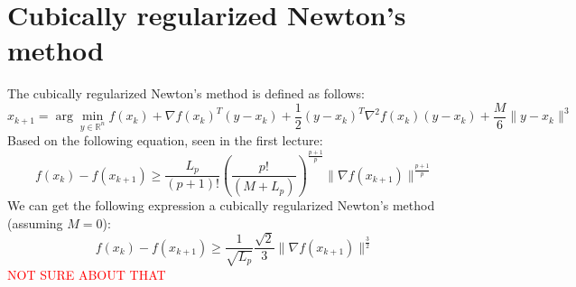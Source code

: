 \documentclass[12pt, openany]{report}
\newcommand{\R}{\mathbb{R}}
\theoremstyle{definition}
\begin{document}
\section{Cubically regularized Newton's method}
The cubically regularized Newton's method is defined as follows:
\begin{equation}\label{eq:cubically_regularized_newton}
	x_{k+1} = \arg \min_{y \in \R^n} f(x_k) + \nabla f(x_k)^T (y-x_k) + \frac{1}{2} (y-x_k)^T \nabla^2 f(x_k) (y-x_k) + \frac{M}{6} \|y-x_k\|^3
\end{equation}
Based on the following equation, seen in the first lecture:
\begin{equation}
	f(x_k) - f(x_{k+1}) \geq \frac{L_p}{(p+1)!} \left(\frac{p!}{(M+L_p)}\right)^{\frac{p+1}{p}} \|\nabla f(x_{k+1})\|^{\frac{p+1}{p}}
\end{equation}
We can get the following expression a cubically regularized Newton's method (assuming $M=0$):
\begin{equation}
	f(x_k) - f(x_{k+1}) \geq \frac{1}{\sqrt{L_p}} \frac{\sqrt{2}}{3} \|\nabla f(x_{k+1})\|^{\frac{3}{2}}
\end{equation}
\textcolor{red}{NOT SURE ABOUT THAT}
\end{document}
